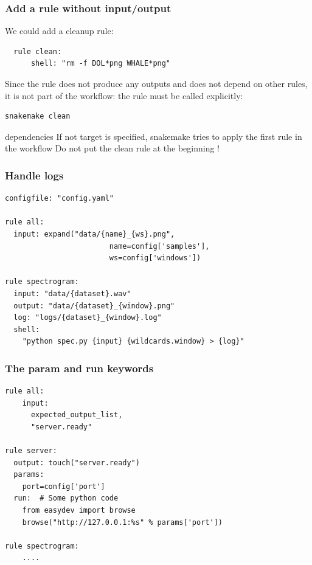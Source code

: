 \documentclass{beamer}
\begin{document}
\begin{frame}[fragile]
 \frametitle{Add a rule without input/output}
 
 We could add a cleanup rule:
 
 \begin{block}{}
 \begin{lstlisting}
  rule clean:
      shell: "rm -f DOL*png WHALE*png"
    \end{lstlisting}
 \end{block}

 Since the rule does not produce any outputs and does not depend on other rules, 
 it is not part of the workflow: the rule must be called explicitly:
 
 
 \begin{block}{}
 \begin{lstlisting}[language=bash]
 snakemake clean
 \end{lstlisting}
 \end{block}
 
 \begin{alertblock}{dependencies}
  If not target is specified, snakemake tries to apply the first rule in the workflow
  Do not put the clean rule at the beginning !
 \end{alertblock} 
\end{frame}



\begin{frame}[fragile]
 \frametitle{Handle logs}    
    \begin{block}{}
    \begin{lstlisting}[basicstyle=\small]
configfile: "config.yaml"

rule all:
  input: expand("data/{name}_{ws}.png", 
                        name=config['samples'], 
                        ws=config['windows'])

rule spectrogram:
  input: "data/{dataset}.wav"
  output: "data/{dataset}_{window}.png"
  log: "logs/{dataset}_{window}.log"
  shell: 
    "python spec.py {input} {wildcards.window} > {log}"  
    \end{lstlisting}
    \end{block} 
\end{frame}


\begin{frame}[fragile]
 \frametitle{The \textbf{param} and \textbf{run} keywords}
   \begin{block}{}
    \begin{lstlisting}[basicstyle=\small]
rule all:
    input: 
      expected_output_list,
      "server.ready"

rule server:
  output: touch("server.ready")
  params: 
    port=config['port']
  run:  # Some python code
    from easydev import browse
    browse("http://127.0.0.1:%s" % params['port'])

rule spectrogram:
    ....
    \end{lstlisting}
    \end{block} 
\end{frame}
\end{document}
